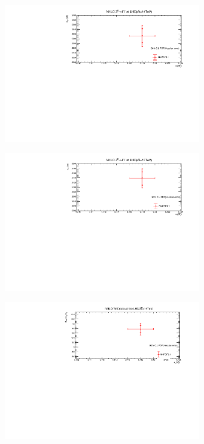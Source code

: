 \begin{figure}[H]
\begin{subfigure}{0.49\textwidth}
\includegraphics[height=6cm, width=\textwidth]{chapter4/Z14_hessian.pdf}
\vspace*{-8mm}
\caption{}
\label{z14_he}
\end{subfigure}
\begin{subfigure}{0.49\textwidth}
\includegraphics[height=6cm, width=\textwidth]{chapter4/Z13_hessian.pdf}
\vspace*{-8mm}
\caption{}
\label{z13_he}
\end{subfigure}
\begin{subfigure}{0.49\textwidth}
\includegraphics[height=6cm, width=\textwidth]{chapter4/Rwz_hessian.pdf}
\vspace*{-8mm}
\caption{}
\label{rwz14_he}
\end{subfigure}
\begin{subfigure}{0.49\textwidth}

\end{subfigure}
\end{figure}
